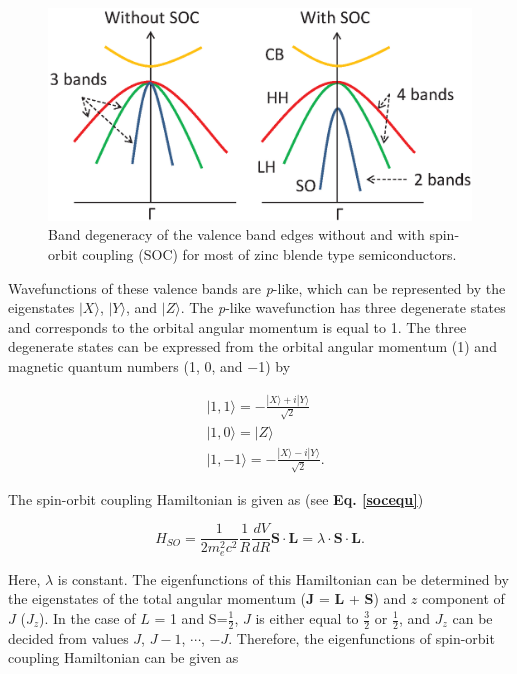 \documentclass[a4paper, 12pt, titlepage,oneside,drop]{kthesis}
\begin{document}
\begin{figure}[H]
\centering
\includegraphics[scale=0.8]{bands.eps} 
\caption{Band degeneracy of the valence band edges without and with spin-orbit coupling (SOC) for most of zinc blende type semiconductors.}
\label{device}
\end{figure}


Wavefunctions of these valence bands are \textit{p}-like, which can be represented by the eigenstates $|X\rangle$, $|Y\rangle$, and $|Z\rangle$. 
The \textit{p}-like wavefunction has three degenerate states and corresponds to the orbital angular momentum is equal to 1. The three degenerate states can be expressed from the orbital angular momentum (1) and magnetic quantum numbers (1, 0, and $-$1) by

\begin{equation}\begin{split}\label{77}
& | 1, 1 \rangle = - \frac{|X\rangle+i|Y\rangle}{\sqrt{2}} \\
& | 1, 0 \rangle =  |Z\rangle \\
& | 1, -1 \rangle = - \frac{|X\rangle-i|Y\rangle}{\sqrt{2}}.
\end{split}
\end{equation}

The spin-orbit coupling Hamiltonian is given as (see \textbf{Eq. \ref{socequ}})

\begin{equation}\label{88}
H_{SO}=\frac{1}{2 m_e^2 c^2} \frac{1}{R} \frac{dV}{dR}\textbf{S}\cdot\textbf{L} = \lambda\cdot \textbf{S}\cdot\textbf{L}.
\end{equation}

Here, $\lambda$ is constant. The eigenfunctions of this Hamiltonian can be determined by the eigenstates of the total angular momentum (\textbf{J} = \textbf{L} + \textbf{S}) and $z$ component of $J$ ($J_z$). In the case of $L$ = 1 and S=$\frac{1}{2}$,
$J$ is either equal to $\frac{3}{2}$ or $\frac{1}{2}$, and $J_z$ can be decided from values $J$, $J-1$, $\cdots$, $-J$. Therefore, the eigenfunctions of spin-orbit coupling Hamiltonian can be given as 
\end{document}

